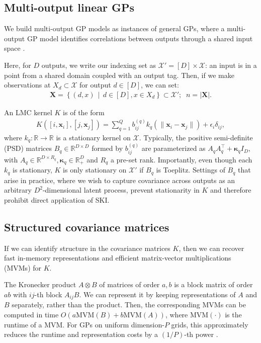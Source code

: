 \documentclass{article}
\def\bsk{{\boldsymbol\kappa}}
\def \R {\mathbb{R}}
\def\Tx{\textbf{x}}
\def\TX{\textbf{X}}
\newcommand{\set}[2]{ \left\{ #1 \,\middle|\, #2 \right\} }
\newcommand{\card}[1]{\left\vert{#1}\right\vert}
\newcommand{\norm}[1]{\mathopen\| #1 \mathclose\|}%
\def \mcX {\mathcal{X}}
\begin{document}
\subsection{Multi-output linear GPs}

We build multi-output GP models as instances of general GPs, where a multi-output GP model identifies correlations between outputs through a shared input space \cite{alvarez2011kernels}.

Here, for $D$ outputs, we write our indexing set as $\mcX'=[D]\times \mcX$: an input is in a point from a shared domain coupled with an output tag. Then, if we make observations at $X_d\subset\mcX$ for output $d\in[D]$, we can set:
\begin{align*}
\TX=\set{(d, x)}{d\in[D],x\in X_d}\subset{\mcX'};\;\; n=\card{\TX}.
\end{align*}

An LMC kernel $K$ is of the form 
\begin{align}
K([i,\Tx_i],[j,\Tx_j])=\sum_{q=1}^Qb_{ij}^{(q)}k_q(\norm{\Tx_i-\Tx_j})+\epsilon_i\delta_{ij},\label{lmcpointwise}
\end{align} 
where $k_q:\R\rightarrow\R$ is a stationary kernel on $\mcX$. Typically, the positive semi-definite (PSD) matrices $B_q\in\R^{D\times D}$ formed by $b_{ij}^{(q)}$ are parameterized as $A_qA_q^\top+\bsk_q I_D$, with $A_q\in\R^{D\times R_q},\bsk_q\in\R_+^D$ and $R_q$ a pre-set rank. Importantly, even though each $k_q$ is stationary, $K$ is only stationary on $\mcX'$ if $B_q$ is Toeplitz. Settings of $B_q$ that arise in practice, where we wish to capture covariance across outputs as an arbitrary $D^2$-dimensional latent process,  prevent stationarity in $K$ and therefore prohibit direct application of SKI.

\subsection{Structured covariance matrices}

If we can identify structure in the covariance matrices $K$, then we can recover fast in-memory representations and efficient matrix-vector multiplications (MVMs) for $K$.

The Kronecker product $A\otimes B$ of matrices of order $a,b$ is a block matrix of order $ab$ with $ij$-th block $A_{ij}B$. We can represent it by keeping representations of $A$ and $B$ separately, rather than the product. Then, the corresponding MVMs can be computed in time $O(a\text{MVM}(B)+b\text{MVM}(A))$, where $\text{MVM}(\cdot)$ is the runtime of a MVM. For GPs on uniform dimension-$P$ grids, this approximately reduces the runtime and representation costs by a $(1/P)$-th power \cite{gilboa2015scaling}.
\end{document}
